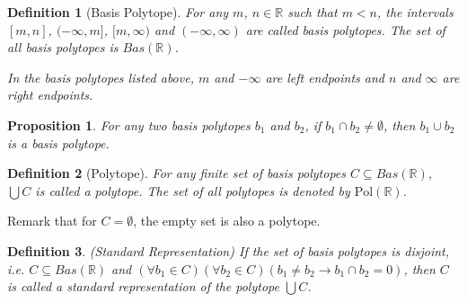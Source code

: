 \documentclass{article}
\newtheorem*{definition}{Definition}
\newtheorem*{proposition}{Proposition}
\newcommand{\R}{\mathbb{R}}
\newcommand{\Pol}{\text{Pol}}
\begin{document}
\begin{definition}[Basis Polytope]
  For any $m$, $n \in \R$ such that $m < n$, the intervals $[m, n]$, $(-\infty, m]$, $[m, \infty)$ and $(-\infty, \infty)$ are called \emph{basis polytopes}. The set of all basis polytopes is $Bas(\R)$.

      In the basis polytopes listed above, $m$ and $-\infty$ are left endpoints and $n$ and $\infty$ are right endpoints.
\end{definition}

\begin{proposition}
  For any two basis polytopes $b_1$ and $b_2$, if $b_1 \cap b_2 \neq \emptyset$, then $b_1 \cup b_2$ is a basis polytope.
\end{proposition}

\begin{definition}[Polytope]
For any finite set of basis polytopes $C \subseteq Bas(\R)$, $\bigcup C$ is called a \emph{polytope}. The set of all polytopes is denoted by $\Pol(\R)$.
\end{definition}
Remark that for $C = \emptyset$, the empty set is also a polytope.

\begin{definition}(Standard Representation)
If the set of basis polytopes is disjoint, i.e. $C \subseteq Bas(\R)$ and $(\forall b_1 \in C)(\forall b_2 \in C)(b_1 \neq b_2 \rightarrow b_1 \cap b_2 = 0)$, then $C$ is called a \emph{standard representation} of the polytope $\bigcup C$.
\end{definition}
\end{document}
